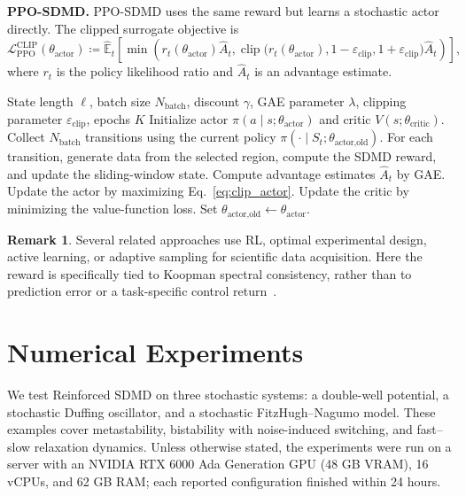 \documentclass{article}
\numberwithin{equation}{section}
\theoremstyle{definition}
\newtheorem{remark}[theorem]{Remark}
\newcommand{\actor}{\text{actor}}
\newcommand{\critic}{\text{critic}}
\newcommand{\old}{\text{old}}
\begin{document}
\textbf{PPO-SDMD.}
PPO-SDMD uses the same reward but learns a stochastic actor directly. The clipped surrogate objective is
\begin{equation}\label{eq:clip_actor}
    \mathcal{L}^{\mathrm{CLIP}}_{\mathrm{PPO}}(\theta_{\actor})
    \coloneqq
    \widehat{\mathbb{E}}_t
    \left[
    \min\left(
    r_t(\theta_{\actor})\widehat{A}_t,
    \operatorname{clip}\bigl(r_t(\theta_{\actor}),1-\varepsilon_{\mathrm{clip}},1+\varepsilon_{\mathrm{clip}}\bigr)\widehat{A}_t
    \right)
    \right],
\end{equation}
where $r_t$ is the policy likelihood ratio and $\widehat A_t$ is an advantage estimate.
\begin{algorithm}
\caption{PPO with SDMD}
\label{alg:ppo_sdmd}
\begin{algorithmic}[1]
\Require State length $\ell$, batch size $N_{\mathrm{batch}}$, discount $\gamma$, GAE parameter $\lambda$, clipping parameter $\varepsilon_{\mathrm{clip}}$, epochs $K$
\State Initialize actor $\pi(a\mid s;\theta_{\actor})$ and critic $V(s;\theta_{\critic})$.
    \State Collect $N_{\mathrm{batch}}$ transitions using the current policy $\pi(\cdot\mid S_t;\theta_{\actor,\old})$.
    \State For each transition, generate data from the selected region, compute the SDMD reward, and update the sliding-window state.
    \State Compute advantage estimates $\widehat A_t$ by GAE.
        \State Update the actor by maximizing Eq.~\eqref{eq:clip_actor}.
        \State Update the critic by minimizing the value-function loss.
    \EndFor
    \State Set $\theta_{\actor,\old}\leftarrow\theta_{\actor}$.
\EndFor
\end{algorithmic}
\end{algorithm}

\begin{remark}
Several related approaches use RL, optimal experimental design, active learning, or adaptive sampling for scientific data acquisition. Here the reward is specifically tied to Koopman spectral consistency, rather than to prediction error or a task-specific control return~\cite{fannjiang2020autofocused,grayeli2024symbolic,hsu2010algorithms,shen2025variational,zhao2024policy,zhang2024adaptive}.
\end{remark}

\section{Numerical Experiments}\label{sec:experiments}
We test Reinforced SDMD on three stochastic systems: a double-well potential, a stochastic Duffing oscillator, and a stochastic FitzHugh--Nagumo model. These examples cover metastability, bistability with noise-induced switching, and fast--slow relaxation dynamics. Unless otherwise stated, the experiments were run on a server with an NVIDIA RTX 6000 Ada Generation GPU (48 GB VRAM), 16 vCPUs, and 62 GB RAM; each reported configuration finished within 24 hours.
\end{document}
